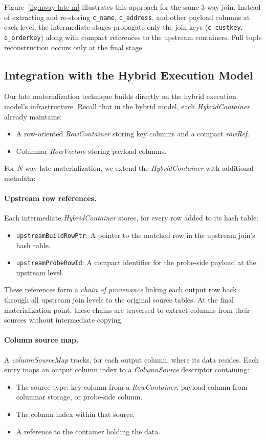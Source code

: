 Figure~\ref{fig:nway-late-m} illustrates this approach for the same 3-way join.
Instead of extracting and re-storing \texttt{c\_name}, \texttt{c\_address}, and other payload columns at each level, the intermediate stages propagate only the join keys (\texttt{c\_custkey}, \texttt{o\_orderkey}) along with compact references to the upstream containers.
Full tuple reconstruction occurs only at the final stage.


\subsection{Integration with the Hybrid Execution Model}

Our late materialization technique builds directly on the hybrid execution model's infrastructure.
Recall that in the hybrid model, each \emph{HybridContainer} already maintains:
\begin{itemize}[leftmargin=*]
  \item A row-oriented \emph{RowContainer} storing key columns and a compact \emph{rowRef}.
  \item Columnar \emph{RowVector}s storing payload columns.
\end{itemize}

For $N$-way late materialization, we extend the \emph{HybridContainer} with additional metadata:

\paragraph{Upstream row references.}
Each intermediate \emph{HybridContainer} stores, for every row added to its hash table:
\begin{itemize}[leftmargin=*]
  \item \texttt{upstreamBuildRowPtr}: A pointer to the matched row in the upstream join's hash table.
  \item \texttt{upstreamProbeRowId}: A compact identifier for the probe-side payload at the upstream level.
\end{itemize}

These references form a \emph{chain of provenance} linking each output row back through all upstream join levels to the original source tables.
At the final materialization point, these chains are traversed to extract columns from their sources without intermediate copying.

\paragraph{Column source map.}
A \emph{columnSourceMap} tracks, for each output column, where its data resides.
Each entry maps an output column index to a \emph{ColumnSource} descriptor containing:
\begin{itemize}[leftmargin=*]
  \item The source type: key column from a \emph{RowContainer}, payload column from columnar storage, or probe-side column.
  \item The column index within that source.
  \item A reference to the container holding the data.
\end{itemize}

